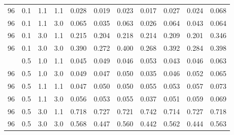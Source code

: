 \begin{longtable}[t]{ccccrrrrrrc}
96 & 0.1 & 1.1 & 1.1 & 0.028 & 0.019 & 0.023 & 0.017 & 0.027 & 0.024 & 0.068\\
96 & 0.1 & 1.1 & 3.0 & 0.065 & 0.035 & 0.063 & 0.026 & 0.064 & 0.043 & 0.064\\
96 & 0.1 & 3.0 & 1.1 & 0.215 & 0.204 & 0.218 & 0.214 & 0.209 & 0.201 & 0.346\\
96 & 0.1 & 3.0 & 3.0 & 0.390 & 0.272 & 0.400 & 0.268 & 0.392 & 0.284 & 0.398\\
\addlinespace
96 & 0.5 & 1.0 & 1.1 & 0.045 & 0.049 & 0.046 & 0.053 & 0.043 & 0.046 & 0.063\\
96 & 0.5 & 1.0 & 3.0 & 0.049 & 0.047 & 0.050 & 0.035 & 0.046 & 0.052 & 0.065\\
96 & 0.5 & 1.1 & 1.1 & 0.047 & 0.050 & 0.050 & 0.055 & 0.053 & 0.057 & 0.073\\
96 & 0.5 & 1.1 & 3.0 & 0.056 & 0.053 & 0.055 & 0.037 & 0.051 & 0.059 & 0.069\\
96 & 0.5 & 3.0 & 1.1 & 0.718 & 0.727 & 0.721 & 0.742 & 0.714 & 0.727 & 0.718\\
96 & 0.5 & 3.0 & 3.0 & 0.568 & 0.447 & 0.560 & 0.442 & 0.562 & 0.444 & 0.563\\
\bottomrule
\end{longtable}
\endgroup{}
